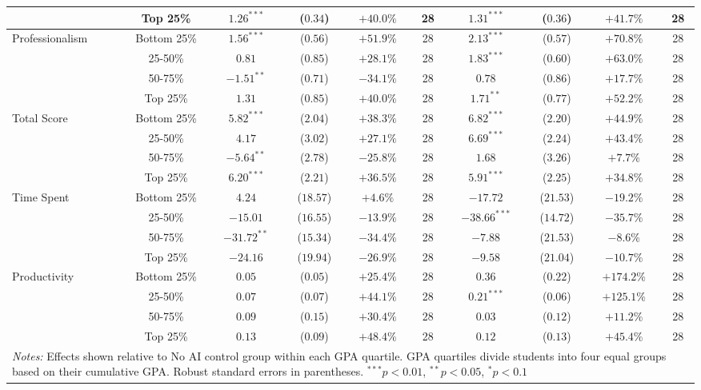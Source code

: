 \begin{table}[!htbp]
\begin{tabular}{lccccccccc}
& Top 25\% & $1.26^{***}$ & ($0.34$) & $+40.0\%$ & 28 & $1.31^{***}$ & ($0.36$) & $+41.7\%$ & 28 \\
\hline
\multirow{4}{*}{Professionalism} & Bottom 25\% & $1.56^{***}$ & ($0.56$) & $+51.9\%$ & 28 & $2.13^{***}$ & ($0.57$) & $+70.8\%$ & 28 \\
& 25-50\% & $0.81$ & ($0.85$) & $+28.1\%$ & 28 & $1.83^{***}$ & ($0.60$) & $+63.0\%$ & 28 \\
& 50-75\% & $-1.51^{**}$ & ($0.71$) & $-34.1\%$ & 28 & $0.78$ & ($0.86$) & $+17.7\%$ & 28 \\
& Top 25\% & $1.31$ & ($0.85$) & $+40.0\%$ & 28 & $1.71^{**}$ & ($0.77$) & $+52.2\%$ & 28 \\
\hline
\multirow{4}{*}{Total Score} & Bottom 25\% & $5.82^{***}$ & ($2.04$) & $+38.3\%$ & 28 & $6.82^{***}$ & ($2.20$) & $+44.9\%$ & 28 \\
& 25-50\% & $4.17$ & ($3.02$) & $+27.1\%$ & 28 & $6.69^{***}$ & ($2.24$) & $+43.4\%$ & 28 \\
& 50-75\% & $-5.64^{**}$ & ($2.78$) & $-25.8\%$ & 28 & $1.68$ & ($3.26$) & $+7.7\%$ & 28 \\
& Top 25\% & $6.20^{***}$ & ($2.21$) & $+36.5\%$ & 28 & $5.91^{***}$ & ($2.25$) & $+34.8\%$ & 28 \\
\hline
\multirow{4}{*}{Time Spent} & Bottom 25\% & $4.24$ & ($18.57$) & $+4.6\%$ & 28 & $-17.72$ & ($21.53$) & $-19.2\%$ & 28 \\
& 25-50\% & $-15.01$ & ($16.55$) & $-13.9\%$ & 28 & $-38.66^{***}$ & ($14.72$) & $-35.7\%$ & 28 \\
& 50-75\% & $-31.72^{**}$ & ($15.34$) & $-34.4\%$ & 28 & $-7.88$ & ($21.53$) & $-8.6\%$ & 28 \\
& Top 25\% & $-24.16$ & ($19.94$) & $-26.9\%$ & 28 & $-9.58$ & ($21.04$) & $-10.7\%$ & 28 \\
\hline
\multirow{4}{*}{Productivity} & Bottom 25\% & $0.05$ & ($0.05$) & $+25.4\%$ & 28 & $0.36$ & ($0.22$) & $+174.2\%$ & 28 \\
& 25-50\% & $0.07$ & ($0.07$) & $+44.1\%$ & 28 & $0.21^{***}$ & ($0.06$) & $+125.1\%$ & 28 \\
& 50-75\% & $0.09$ & ($0.15$) & $+30.4\%$ & 28 & $0.03$ & ($0.12$) & $+11.2\%$ & 28 \\
& Top 25\% & $0.13$ & ($0.09$) & $+48.4\%$ & 28 & $0.12$ & ($0.13$) & $+45.4\%$ & 28 \\
\hline
\multicolumn{10}{p{0.95\linewidth}}{\footnotesize \textit{Notes:} Effects shown relative to No AI control group within each GPA quartile. GPA quartiles divide students into four equal groups based on their cumulative GPA. Robust standard errors in parentheses. $^{***}p<0.01$, $^{**}p<0.05$, $^{*}p<0.1$}
\end{tabular}
\end{table}
